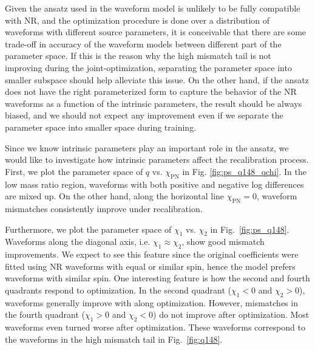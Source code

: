 \documentclass[twocolumn]{aastex631}
\begin{document}

Given the ansatz used in the waveform model is unlikely to be fully compatible
with NR, and the optimization procedure is done over a distribution of waveforms
with different source parameters, it is conceivable that there are some
trade-off in accuracy of the waveform models between different part of the
parameter space. If this is the reason why the high mismatch tail is not
improving during the joint-optimization, separating the parameter space into
smaller subspace should help alleviate this issue. On the other hand, if the
ansatz does not have the right parameterized form to capture the behavior of the
NR waveforms as a function of the intrinsic parameters, the result should be
always biased, and we should not expect any improvement even if we separate the
parameter space into smaller space during training.

Since we know intrinsic parameters play an important role in the ansatz, we
would like to investigate how intrinsic parameters affect the recalibration
process. First, we plot the parameter space of $q$ vs. $\chi_{\mathrm{PN}}$ in
Fig. \ref{fig:ps_q148_qchi}. In the low mass ratio region, waveforms with both
positive and negative log differences are mixed up. On the other hand, along the
horizontal line $\chi_{\mathrm{PN}}=0$, waveform mismatches consistently improve
under recalibration. 

Furthermore, we plot the parameter space of $\chi_1$ vs. $\chi_2$ in
Fig.~\ref{fig:ps_q148}. Waveforms along the diagonal axis, i.e.
$\chi_1\approx\chi_2$, show good mismatch improvements. We expect to see this
feature since the original coefficients were fitted using NR waveforms with
equal or similar spin, hence the model prefers waveforms with similar spin. One
interesting feature is how the second and fourth quadrants respond to
optimization. In the second quadrant ($\chi_1<0$ and $\chi_2>0$), waveforms
generally improve with along optimization. However, mismatches in the fourth
quadrant ($\chi_1>0$ and $\chi_2<0$) do not improve after optimization. Most
waveforms even turned worse after optimization. These waveforms correspond to
the waveforms in the high mismatch tail in Fig.~\ref{fig:q148}. 
\end{document}
